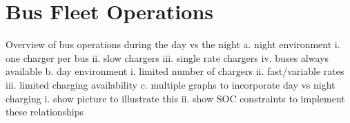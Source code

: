 \section{Bus Fleet Operations}
Overview of bus operations during the day vs the night
    a. night environment
        i. one charger per bus
        ii. slow chargers
        iii. single rate chargers
        iv. buses always available
    b. day environment
        i. limited number of chargers
        ii. fast/variable rates
        iii. limited charging availability
    c. multiple graphs to incorporate day vs night charging
        i. show picture to illustrate this
	ii. show SOC constraints to implement these relationships


